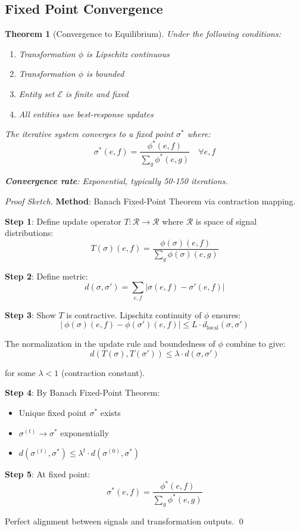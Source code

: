 \documentclass[11pt,a4paper]{article}
\newtheorem{theorem}{Theorem}[section]
\theoremstyle{definition}
\theoremstyle{remark}
\newcommand{\E}{\mathcal{E}}
\begin{document}
\subsection{Fixed Point Convergence}

\begin{theorem}[Convergence to Equilibrium]
\label{thm:convergence}
Under the following conditions:
\begin{enumerate}
\item Transformation $\phi$ is Lipschitz continuous
\item Transformation $\phi$ is bounded
\item Entity set $\E$ is finite and fixed
\item All entities use best-response updates
\end{enumerate}

The iterative system converges to a fixed point $\sigma^*$ where:
\[ \sigma^*(e,f) = \frac{\phi^*(e,f)}{\sum_g \phi^*(e,g)} \quad \forall e,f \]

\textbf{Convergence rate}: Exponential, typically 50-150 iterations.
\end{theorem}

\begin{proof}[Proof Sketch]
\textbf{Method}: Banach Fixed-Point Theorem via contraction mapping.

\textbf{Step 1}: Define update operator $T: \mathcal{R} \to \mathcal{R}$ where $\mathcal{R}$ is space of signal distributions:
\[ T(\sigma)(e,f) = \frac{\phi(\sigma)(e,f)}{\sum_g \phi(\sigma)(e,g)} \]

\textbf{Step 2}: Define metric:
\[ d(\sigma, \sigma') = \sum_{e,f} |\sigma(e,f) - \sigma'(e,f)| \]

\textbf{Step 3}: Show $T$ is contractive. Lipschitz continuity of $\phi$ ensures:
\[ |\ \phi(\sigma)(e,f) - \phi(\sigma')(e,f)| \le L \cdot d_{\text{local}}(\sigma, \sigma') \]

The normalization in the update rule and boundedness of $\phi$ combine to give:
\[ d(T(\sigma), T(\sigma')) \le \lambda \cdot d(\sigma, \sigma') \]

for some $\lambda < 1$ (contraction constant).

\textbf{Step 4}: By Banach Fixed-Point Theorem:
\begin{itemize}
\item Unique fixed point $\sigma^*$ exists
\item $\sigma^{(t)} \to \sigma^*$ exponentially
\item $d(\sigma^{(t)}, \sigma^*) \le \lambda^t \cdot d(\sigma^{(0)}, \sigma^*)$
\end{itemize}

\textbf{Step 5}: At fixed point:
\[ \sigma^*(e,f) = \frac{\phi^*(e,f)}{\sum_g \phi^*(e,g)} \]

Perfect alignment between signals and transformation outputs. \qed
\end{proof}
\end{document}
